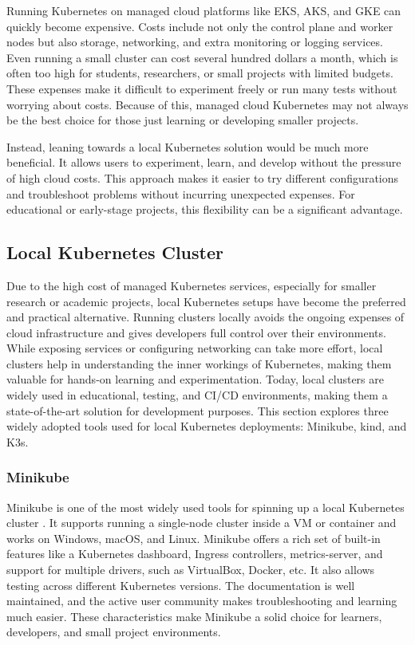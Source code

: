 Running Kubernetes on managed cloud platforms like EKS, AKS, and GKE can quickly become expensive. Costs include not only the control plane and worker nodes but also storage, networking, and extra monitoring or logging services. Even running a small cluster can cost several hundred dollars a month, which is often too high for students, researchers, or small projects with limited budgets. These expenses make it difficult to experiment freely or run many tests without worrying about costs. Because of this, managed cloud Kubernetes may not always be the best choice for those just learning or developing smaller projects.

Instead, leaning towards a local Kubernetes solution would be much more beneficial. It allows users to experiment, learn, and develop without the pressure of high cloud costs. This approach makes it easier to try different configurations and troubleshoot problems without incurring unexpected expenses. For educational or early-stage projects, this flexibility can be a significant advantage.

\subsection{Local Kubernetes Cluster}
Due to the high cost of managed Kubernetes services, especially for smaller research or academic projects, local Kubernetes setups have become the preferred and practical alternative. Running clusters locally avoids the ongoing expenses of cloud infrastructure and gives developers full control over their environments. While exposing services or configuring networking can take more effort, local clusters help in understanding the inner workings of Kubernetes, making them valuable for hands-on learning and experimentation. Today, local clusters are widely used in educational, testing, and CI/CD environments, making them a state-of-the-art solution for development purposes. This section explores three widely adopted tools used for local Kubernetes deployments: Minikube, kind, and K3s.

\subsubsection{Minikube}
Minikube is one of the most widely used tools for spinning up a local Kubernetes cluster \cite{minikube-docs}. It supports running a single-node cluster inside a VM or container and works on Windows, macOS, and Linux. Minikube offers a rich set of built-in features like a Kubernetes dashboard, Ingress controllers, metrics-server, and support for multiple drivers, such as VirtualBox, Docker, etc. It also allows testing across different Kubernetes versions. The documentation is well maintained, and the active user community makes troubleshooting and learning much easier. These characteristics make Minikube a solid choice for learners, developers, and small project environments.


